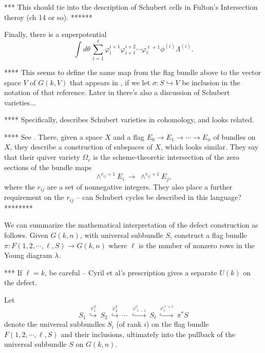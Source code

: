\documentclass[12pt]{article}
\begin{document}
*** This should tie into the description of Schubert cells in
Fulton's Intersection theroy (ch 14 or so).
******


Finally, there is a superpotential
\begin{equation}
\int d \theta \, \sum_{i=1}^{\ell} \varphi_i^{i+1} \varphi_{i+1}^{i+2}
\cdots \varphi_{\ell}^{\ell+1} \phi^{(i)} \Lambda^{(i)}.
\end{equation}

**** This seems to define the same map from the flag bundle above to 
the vector space $V$ of $G(k,V)$ that appears in
\cite[section 14.3]{fulton}, if we let $\sigma: S \hookrightarrow
V$ be inclusion in the notation of that reference.  Later in
\cite[chapter 14]{fulton} there's also a discussion of Schubert varieties...

**** Specifically, \cite[section 14.3]{fulton} describes Schubert varieties
in cohomology, and looks related.

**** See \cite[theorem 2.1]{buch1}.  There, given a space $X$ and a flag
$E_0 \rightarrow E_1 \rightarrow \cdots \rightarrow E_n$ of bundles
on $X$, they describe a construction of subspaces of $X$, which looks
similar.
They say that their quiver variety $\Omega_r$ is the scheme-theoretic
intersection of the zero sections of the bundle maps 
\begin{equation}
\wedge^{r_{ij}+1} E_i \: \longrightarrow \: \wedge^{r_{ij}+1} E_j,
\end{equation}
where the $r_{ij}$ are a set of nonnegative integers.
They also place a further requirement on the $r_{ij}$ -- can Schubert
cycles be described in this language?
********


We can summarize the mathematical interpretation of the defect
construction as follows.  Given $G(k,n)$, with universal subbundle $S$,
construct a flag bundle $\pi: F(1,2,\cdots,\ell,S) \rightarrow G(k,n)$
where $\ell$ is the number
of nonzero rows in the Young diagram $\lambda$.

*** If $\ell=k$, be careful -- Cyril et al's prescription gives a 
separate $U(k)$ on the defect.

Let 
\begin{equation}
S_{1} \: \stackrel{\varphi_1^2}{\hookrightarrow} \:
S_2 \: \stackrel{\varphi_2^3}{\hookrightarrow} \:
\cdots \:
\: \stackrel{\varphi_{\ell-1}^{\ell}}{\hookrightarrow} \:
S_{\ell} \: \stackrel{\varphi_{\ell}^{\ell+1}}{\hookrightarrow} \:
\pi^* S
\end{equation}
denote the universal subbundles $S_i$ (of rank $i$) 
on the flag bundle $F(1,2,\cdots,\ell,S)$
and their inclusions, ultimately into the pullback of the universal
subbundle $S$ on $G(k,n)$.
\end{document}
